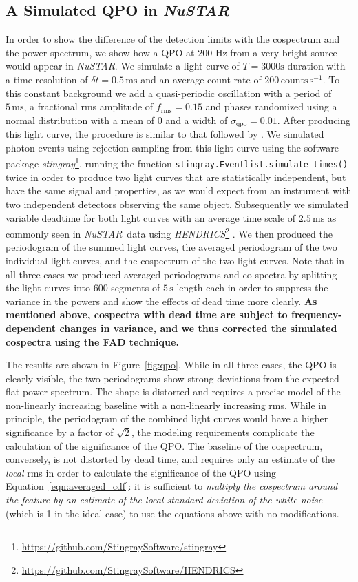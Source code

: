 \documentclass[12pt]{emulateapj}
\newcommand{\project}[1]{\textsl{#1}}
\newcommand{\nustar}{\project{NuSTAR}\xspace}
\begin{document}
\subsection{A Simulated QPO in \nustar}

In order to show the difference of the detection limits with the cospectrum and the power spectrum, we show how a QPO at 200 Hz from a very bright source would appear in \nustar. 
We simulate a light curve of $T=3000\mathrm{s}$ duration with a time resolution of $\delta t = 0.5 \,\mathrm{ms}$ and an average count rate of $200 \,\mathrm{counts}\,\mathrm{s}^{-1}$. To this constant background we add a quasi-periodic oscillation with a period of $5\,\mathrm{ms}$, a fractional rms amplitude of $f_\mathrm{rms} = 0.15$ and phases randomized using a normal distribution with a mean of $0$ and a width of $\sigma_\mathrm{qpo} = 0.01$. After producing this light curve, the procedure is similar to that followed by \citet{Bachetti+15}. We simulated photon events using rejection sampling from this light curve using the software package \textit{stingray}\footnote{\url{https://github.com/StingraySoftware/stingray}}, running the function \texttt{stingray.Eventlist.simulate\_times()} twice in order to produce two light curves that are statistically independent, but have the same signal and properties, as we would expect from an instrument with two independent detectors observing the same object. Subsequently we simulated variable deadtime for both light curves with an average time scale of $2.5 \,\mathrm{ms}$ as commonly seen in \nustar\ data \citep{Bachetti+15} using \textit{HENDRICS}\footnote{\url{https://github.com/StingraySoftware/HENDRICS}} \citep{bachetti2015b}. We then produced the periodogram of the summed light curves, the averaged periodogram of the two individual light curves, and the cospectrum of the two light curves. Note that in all three cases we produced averaged periodograms and co-spectra by splitting the light curves into 600 segments of $5\,\mathrm{s}$ length each in order to suppress the variance in the powers and show the effects of dead time more clearly. \textbf{As mentioned above, cospectra with dead time are subject to frequency-dependent changes in variance, and we thus corrected the simulated cospectra using the FAD technique.}

The results are shown in Figure~\ref{fig:qpo}. While in all three cases, the QPO is clearly visible, the two periodograms show strong deviations from the expected flat power spectrum. The shape is distorted and requires a precise model of the non-linearly increasing baseline with a non-linearly increasing rms. While in principle, the periodogram of the combined light curves would have a higher significance by a factor of $\sqrt{2}$, the modeling requirements complicate the calculation of the significance of the QPO. 
The baseline of the cospectrum, conversely, is not distorted by dead time, and requires only an estimate of the \textit{local} rms in order to calculate the significance of the QPO using Equation~\ref{eqn:averaged_cdf}: it is sufficient to \textit{multiply the cospectrum around the feature by an estimate of the local standard deviation of the white noise} (which is 1 in the ideal case) to use the equations above with no modifications.
\end{document}
